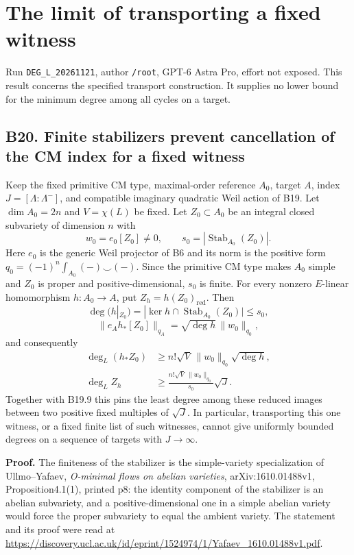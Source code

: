 \documentclass[11pt,a4paper]{article}
\theoremstyle{definition}
\begin{document}
\section{The limit of transporting a fixed witness}

Run \texttt{DEG\_L\_20261121}, author \texttt{/root}, GPT-6 Astra Pro,
effort not exposed. This result concerns the specified transport
construction. It supplies no lower bound for the minimum degree among
all cycles on a target.

\subsection{B20. Finite stabilizers prevent cancellation of the CM index
for a fixed
witness}\label{b20.-finite-stabilizers-prevent-cancellation-of-the-cm-index-for-a-fixed-witness}

Keep the fixed primitive CM type, maximal-order reference \(A_0\),
target \(A\), index \(J=[\Lambda:\Lambda^-]\), and compatible imaginary
quadratic Weil action of B19. Let \(\dim A_0=2n\) and \(V=\chi(L)\) be
fixed. Let \(Z_0\subset A_0\) be an integral closed subvariety of
dimension \(n\) with \[
 w_0=e_0[Z_0]\ne0,
 \qquad s_0=|\operatorname{Stab}_{A_0}(Z_0)|.
\] Here \(e_0\) is the generic Weil projector of B6 and its norm is the
positive form \(q_0=(-1)^n\int_{A_0}(-)\smile(-)\). Since the primitive
CM type makes \(A_0\) simple and \(Z_0\) is proper and
positive-dimensional, \(s_0\) is finite. For every nonzero \(E\)-linear
homomorphism \(h:A_0\to A\), put \(Z_h=h(Z_0)_{\mathrm{red}}\). Then \[
 \deg(h|_{Z_0})
   =|\ker h\cap\operatorname{Stab}_{A_0}(Z_0)|\le s_0,
\tag{B20a}
\] \[
 \|e_A h_*[Z_0]\|_{q_A}
       =\sqrt{\deg h}\,\|w_0\|_{q_0},
\tag{B20b}
\] and consequently \[
 \begin{aligned}
 \deg_L(h_*Z_0)&\ge n!\sqrt V\,\|w_0\|_{q_0}\sqrt{\deg h},\\
 \deg_L Z_h&\ge
   \frac{n!\sqrt V\,\|w_0\|_{q_0}}{s_0}\sqrt J.
 \end{aligned}
\tag{B20c}
\] Together with B19.9 this pins the least degree among these reduced
images between two positive fixed multiples of \(\sqrt J\). In
particular, transporting this one witness, or a fixed finite list of
such witnesses, cannot give uniformly bounded degrees on a sequence of
targets with \(J\to\infty\).

\textbf{Proof.} The finiteness of the stabilizer is the simple-variety
specialization of Ullmo--Yafaev, \emph{O-minimal flows on abelian
varieties}, arXiv:1610.01488v1, Proposition4.1(1), printed p8: the
identity component of the stabilizer is an abelian subvariety, and a
positive-dimensional one in a simple abelian variety would force the
proper subvariety to equal the ambient variety. The statement and its
proof were read at
\url{https://discovery.ucl.ac.uk/id/eprint/1524974/1/Yafaev_1610.01488v1.pdf}.
\end{document}
